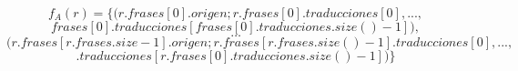 \begin{displaymath}
f_{A}(r) =\{(r.frases[0].origen;r.frases[0].traducciones[0],...,
\end{displaymath}
\begin{displaymath}
 frases[0].traducciones[frases[0].traducciones.size()-1]),
\end{displaymath}
\begin{displaymath}
\ldots
\end{displaymath}
\begin{displaymath}
(r.frases[r.frases.size-1].origen;r.frases[r.frases.size()-1].traducciones[0],...,
\end{displaymath}
\begin{displaymath}
[r.frases.size()-1].traducciones[r.frases[0].traducciones.size()-1])\}
\end{displaymath}

